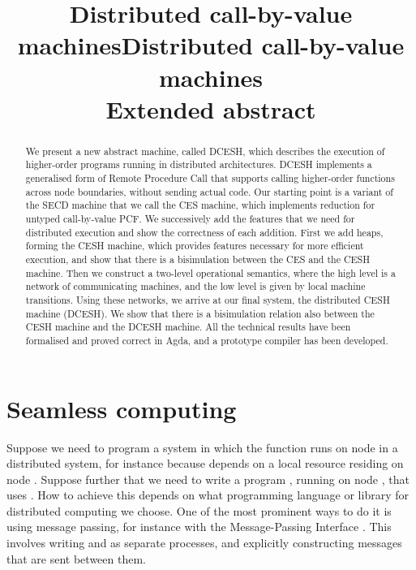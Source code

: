 \documentclass{article}
\title{Distributed call-by-value machines}
\title{Distributed call-by-value machines \\ {\large Extended abstract}}
\author\theauthor
\affil\theaffiliation
\author{\IEEEauthorblockN\theauthor
          \IEEEauthorblockA\theaffiliation
  }
\theoremstyle{definition}
\newcommand{\DCESHn}{DCESH}
\newcommand{\Conid}[1]{\mathit{#1}}
\newcommand{\Varid}[1]{\mathit{#1}}
\renewcommand\Varid[1]{\mathord{\textsf{#1}}}
\let\Conid\Varid
\renewcommand\Varid[1]{\textsf{#1}}
\begin{document}
\iffullversion
\date{}
\fi
\maketitle



\begin{abstract}
We present a new abstract machine, called \DCESHn{}, which describes the
execution of higher-order programs running in distributed architectures.
\DCESHn{} implements a generalised form of Remote Procedure Call that supports
calling higher-order functions across node boundaries, without sending actual
code.  Our starting point is a variant of the SECD machine that we call the CES
machine, which implements reduction for untyped call-by-value PCF.  We
successively add the features that we need for distributed execution and show
the correctness of each addition.  First we add heaps, forming the CESH
machine, which provides features necessary for more efficient execution, and
show that there is a bisimulation between the CES and the CESH machine.  Then
we construct a two-level operational semantics, where the high level is a
network of communicating machines, and the low level is given by local machine
transitions.  Using these networks, we arrive at our final system, the
distributed CESH machine (\DCESHn{}).  We show that there is a bisimulation
relation also between the CESH machine and the \DCESHn{} machine.
All the technical results have been formalised and proved correct
in Agda, and a prototype compiler has been developed.

\end{abstract}

\iffullversion
  \newpage
  \tableofcontents
  \newpage
\fi

\section{Seamless computing}
Suppose we need to program a system in which the function {\textsmaller[.5]{\ensuremath{\Conid{F}}}} runs on node {\textsmaller[.5]{\ensuremath{\Conid{A}}}}
in a distributed system, for instance because {\textsmaller[.5]{\ensuremath{\Conid{F}}}} depends on a local resource
residing on node {\textsmaller[.5]{\ensuremath{\Conid{A}}}}. Suppose further that we need to write a program
{\textsmaller[.5]{\ensuremath{\Conid{G}}}}, running on node {\textsmaller[.5]{\ensuremath{\Conid{B}}}}, that uses {\textsmaller[.5]{\ensuremath{\Conid{F}}}}.  How to achieve this depends on what
programming language or library for distributed computing we choose. One of the
most prominent ways to do it is using message passing, for instance with the
Message-Passing Interface \cite{gropp1999using}.  This involves writing {\textsmaller[.5]{\ensuremath{\Conid{F}}}} and
{\textsmaller[.5]{\ensuremath{\Conid{G}}}} as separate processes, and explicitly constructing messages that are sent
between them.
\end{document}

